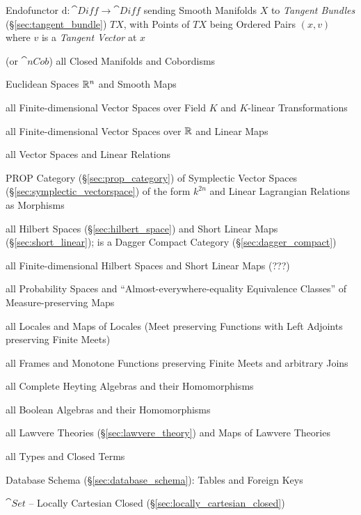 \begin{description}
  Endofunctor $\mathrm{d} : \cat{Diff} \rightarrow \cat{Diff}$ sending Smooth
  Manifolds $X$ to \emph{Tangent Bundles} (\S\ref{sec:tangent_bundle}) $T X$,
  with Points of $T X$ being Ordered Pairs $(x, v)$ where $v$ is a \emph{Tangent
    Vector} at $x$
\item [Cob] (or $\cat{nCob}$) all Closed Manifolds and Cobordisms
\item [Euc] Euclidean Spaces $\mathbb{R}^n$ and Smooth Maps
\item [Vect$_K$] all Finite-dimensional Vector Spaces over Field $K$
  and $K$-linear Transformations
\item [Vect$_\reals$] all Finite-dimensional Vector Spaces over
  $\mathbb{R}$ and Linear Maps
\item [LinRel] all Vector Spaces and Linear Relations %
\item [LagRel$_k$] PROP Category (\S\ref{sec:prop_category}) of Symplectic
  Vector Spaces (\S\ref{sec:symplectic_vectorspace}) of the form $k^{2n}$ and
  Linear Lagrangian Relations as Morphisms
\item [Hilb] all Hilbert Spaces (\S\ref{sec:hilbert_space}) and Short
  Linear Maps (\S\ref{sec:short_linear}); is a Dagger Compact Category
  (\S\ref{sec:dagger_compact})
\item [FdHilb] all Finite-dimensional Hilbert Spaces and Short Linear
  Maps (???)
\item [Prob] all Probability Spaces and ``Almost-everywhere-equality Equivalence
  Classes'' of Measure-preserving Maps
\item [Loc] all Locales and Maps of Locales (Meet preserving Functions
  with Left Adjoints preserving Finite Meets)
\item [Frm] all Frames and Monotone Functions preserving Finite Meets
  and arbitrary Joins
\item [CHey] all Complete Heyting Algebras and their Homomorphisms
\item [BA] all Boolean Algebras and their Homomorphisms
\item [Law] all Lawvere Theories (\S\ref{sec:lawvere_theory}) and Maps
  of Lawvere Theories
\item [C($\lambda$)] all Types and Closed Terms
\end{description}

Database Schema (\S\ref{sec:database_schema}): Tables and Foreign Keys

$\cat{Set}$ -- Locally Cartesian Closed
(\S\ref{sec:locally_cartesian_closed})

